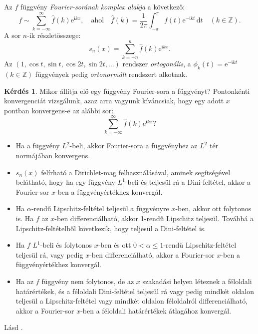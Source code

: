 \documentclass[%
	DIV=15,appendixprefix]{scrreprt}
\theoremstyle{definition}
\newtheorem*{kerdes}{Kérdés}
\theoremstyle{remark}
\newcommand{\imag}{\mathfrak{i}}
\begin{document}
Az $ f $ függvény \emph{Fourier-sorának komplex alakja} a következő:
\begin{equation*}
	f \sim \sum_{ k = - \infty }^{ \infty } \hat{ f } \left( k \right) \mathrm{ e }^{ \imag k x},
	\quad \text{ahol} \quad \hat{ f } \left( k \right) = \frac{ 1 }{ 2 \pi } \int_{ - \pi }^{ \pi }
	f \left( t \right)  \mathrm{ e }^{ - \imag k t} \, \mathrm{ d } t \quad \left( k \in
	\mathbb{ Z } \right).
\end{equation*}
A sor $n$-ik részletösszege:
\begin{equation*}
	s_{ n } \left( x \right)  = \sum_{ k = - n }^{ n } \hat{ f } \left( k \right)
	\mathrm{ e }^{ \imag k x}.
\end{equation*}
Az $ \left( 1,{} \cos t,{} \sin t,{} \cos 2t,{} \sin 2t,{} \ldots \right) $ rendszer
\emph{ortogonális}, a
$\phi_{ k } \left( t \right) = \mathrm{ e }^{ - \imag k t} $ $ \left( k \in \mathbb{ Z } \right) $
függvények pedig \emph{ortonormált} rendszert alkotnak.
\begin{kerdes}
	Mikor állítja elő egy függvény Fourier-sora a függvényt? Pontonkénti konvergenciát vizsgálunk,
	azaz arra vagyunk kíváncsiak, hogy egy adott $ x $ pontban konvergens-e az alábbi sor:
	\begin{equation*}
		\sum_{ k = - \infty }^{ \infty } \hat{ f } \left( k \right) \mathrm{ e }^{ \imag k x}?
	\end{equation*}
\end{kerdes}
\begin{itemize}
	\item Ha a függvény $ L^{ 2 } $-beli, akkor Fourier-sora a függvényhez az $ L^{ 2 } $ tér
		normájában konvergens.
	\item $ s_{ n } \left( x \right) $ felírható a Dirichlet-mag felhasználásával, aminek
		segítségével belátható, hogy ha egy függvény $ L^{ 1 } $-beli és teljesül rá a
		Dini-feltétel, akkor a Fourier-sor $ x $-ben a függvényértékhez konvergál.
	\item Ha $ \alpha $-rendű Lipschitz-feltétel teljesül a függvényre $ x $-ben, akkor ott
		folytonos is. Ha $ f $  az $ x $-ben differenciálható, akkor 1-rendű Lipschitz teljesül.
		Továbbá a Lipschitz-feltételből következik, hogy teljesül a Dini-feltétel is.
	\item Ha $ f $ $ L^{ 1 } $-beli és folytonos $ x $-ben és ott $ 0< \alpha \le 1 $-rendű
		Lipschitz-feltétel teljesül rá, vagy pedig $ x $-ben differenciálható, akkor a Fourier-sor
		$ x $-ben a függvényértékhez konvergál.
	\item Ha az $ f $ függvény nem folytonos, de az $ x $ szakadási helyen léteznek a féloldali
		határértékek, és a féloldali Dini-feltétel teljesül rá vagy pedig mindkét oldalon teljesül a
		Lipschitz-feltétel vagy mindkét oldalon féloldalról differenciálható, akkor a Fourier-sor
		$ x $-ben a féloldali határértékek átlagához konvergál.
\end{itemize}
%
Lásd \cite[4.1. és 4.5.~szakaszok]{SzTNZ}.
\end{document}
